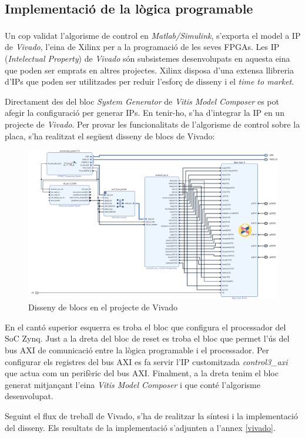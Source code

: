 \subsection{ Implementació de la lògica programable }
{ 
    Un cop validat l'algorisme de control en
    \emph{Matlab/Simulink\textsuperscript{\textregistered}}, s'exporta el model
    a IP de \emph{Vivado}, l'eina de Xilinx per a la programació de les seves
    FPGAs. Les IP (\emph{Intelectual Property}) de \emph{Vivado} són
    subsistemes desenvolupats en aquesta eina que poden ser emprats en altres
    projectes. Xilinx disposa d'una extensa llibreria d'IPs que poden ser
    utilitzades per reduir l'esforç de disseny i el \emph{time to market}.

    Directament des del bloc \emph{System Generator} de \emph{Vitis Model
    Composer} es pot afegir la configuració per generar IPs. En tenir-ho, s'ha
    d'integrar la IP en un projecte de \emph{Vivado}. Per provar les
    funcionalitats de l'algorisme de control sobre la placa, s'ha realitzat el
    següent disseny de blocs de Vivado:

    \begin{figure}[!htb]
        \centering
        \captionsetup{justification=centering,margin=1.5cm}
        \includegraphics[width=15.5cm]
            { img/4_implementacio/vivado.png }
        \caption{ Disseny de blocs en el projecte de Vivado }
    \end{figure}

    En el cantó superior esquerra es troba el bloc que configura el processador
    del SoC Zynq. Just a la dreta del bloc de reset es troba el bloc que permet
    l'ús del bus \ac{AXI} de comunicació entre la lògica programable i el
    processador. Per configurar els registres del bus \ac{AXI} es fa servir l'IP
    customitzada \emph{control3\_axi} que actua com un perifèric del bus \ac{AXI}.
    Finalment, a la dreta tenim el bloc generat mitjançant l'eina \emph{Vitis
    Model Composer} i que conté l'algorisme desenvolupat.

    Seguint el flux de treball de Vivado, s'ha de realitzar la síntesi i la
    implementació del disseny. Els resultats de la implementació s'adjunten a
    l'annex \ref{vivado}.
}

